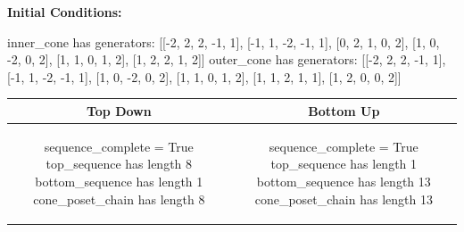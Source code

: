 \documentclass[10pt]{article}
\begin{document}
\textbf{Initial Conditions:}
\begin{SAGE}
inner_cone has generators: 
[[-2, 2, 2, -1, 1], [-1, 1, -2, -1, 1], [0, 2, 1, 0, 2], [1, 0, -2, 0, 2], [1, 1, 0, 1, 2], [1, 2, 2, 1, 2]]
outer_cone has generators: 
[[-2, 2, 2, -1, 1], [-1, 1, -2, -1, 1], [1, 0, -2, 0, 2], [1, 1, 0, 1, 2], [1, 1, 2, 1, 1], [1, 2, 0, 0, 2]]

\end{SAGE}
\begin{tabular}{c|c}
\textbf{Top Down} & \textbf{Bottom Up} \\ \hline  
\begin{SAGE}
sequence_complete = True
top_sequence has length 8
bottom_sequence has length 1
cone_poset_chain has length 8
\end{SAGE} 
&
\begin{SAGE}
sequence_complete = True
top_sequence has length 1
bottom_sequence has length 13
cone_poset_chain has length 13
\end{SAGE} 
\\ \hline


\end{tabular}
\end{document}
